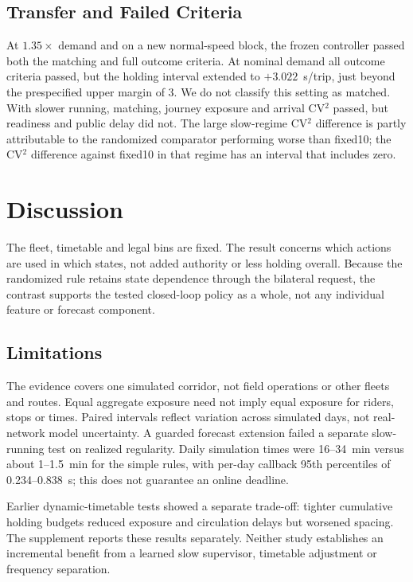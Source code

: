 \documentclass[journal]{IEEEtran}
\begin{document}
\subsection{Transfer and Failed Criteria}
At $1.35\times$ demand and on a new normal-speed block, the frozen controller passed both the matching and full outcome criteria. At nominal demand all outcome criteria passed, but the holding interval extended to $+3.022$~s/trip, just beyond the prespecified upper margin of $3$. We do not classify this setting as matched. With slower running, matching, journey exposure and arrival CV$^2$ passed, but readiness and public delay did not. The large slow-regime CV$^2$ difference is partly attributable to the randomized comparator performing worse than fixed10; the CV$^2$ difference against fixed10 in that regime has an interval that includes zero.

\section{Discussion}
The fleet, timetable and legal bins are fixed. The result concerns which actions are used in which states, not added authority or less holding overall. Because the randomized rule retains state dependence through the bilateral request, the contrast supports the tested closed-loop policy as a whole, not any individual feature or forecast component.

\subsection{Limitations}
The evidence covers one simulated corridor, not field operations or other fleets and routes. Equal aggregate exposure need not imply equal exposure for riders, stops or times. Paired intervals reflect variation across simulated days, not real-network model uncertainty. A guarded forecast extension failed a separate slow-running test on realized regularity. Daily simulation times were 16--34~min versus about 1--1.5~min for the simple rules, with per-day callback 95th percentiles of 0.234--0.838~s; this does not guarantee an online deadline.

Earlier dynamic-timetable tests showed a separate trade-off: tighter cumulative holding budgets reduced exposure and circulation delays but worsened spacing. The supplement reports these results separately. Neither study establishes an incremental benefit from a learned slow supervisor, timetable adjustment or frequency separation.
\end{document}
